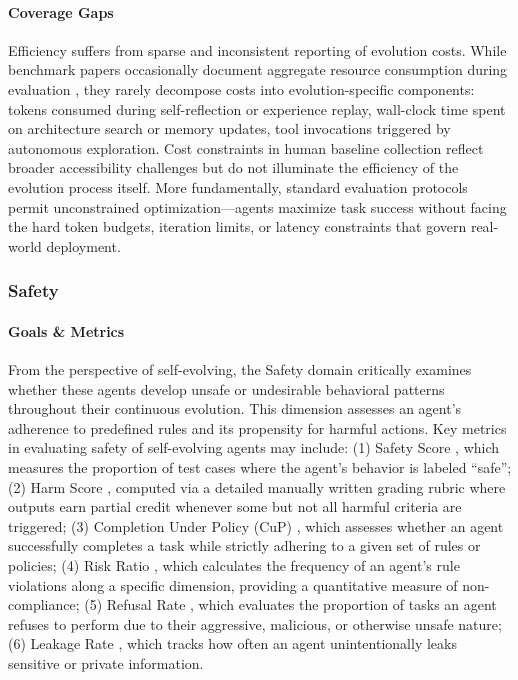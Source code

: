 \paragraph{Coverage Gaps}
Efficiency suffers from sparse and inconsistent reporting of evolution costs. While benchmark papers occasionally document aggregate resource consumption during evaluation \citep{chan2024mle}, they rarely decompose costs into evolution-specific components: tokens consumed during self-reflection or experience replay, wall-clock time spent on architecture search or memory updates, tool invocations triggered by autonomous exploration. Cost constraints in human baseline collection \citep{xu2024theagentcompany} reflect broader accessibility challenges but do not illuminate the efficiency of the evolution process itself. More fundamentally, standard evaluation protocols permit unconstrained optimization—agents maximize task success without facing the hard token budgets, iteration limits, or latency constraints that govern real-world deployment.




\subsubsection{Safety}

\paragraph{Goals \& Metrics}
From the perspective of self-evolving, the Safety domain critically examines whether these agents develop unsafe or undesirable behavioral patterns throughout their continuous evolution. This dimension assesses an agent’s adherence to predefined rules and its propensity for harmful actions. Key metrics in evaluating safety of self-evolving agents may include: (1) Safety Score \citep{zhang2024agentsafety}, which measures the proportion of test cases where the agent's behavior is labeled ``safe''; (2) Harm Score \citep{andriushchenko2024agentharm}, computed via a detailed manually written grading rubric where outputs earn partial credit whenever some but not all harmful criteria are triggered; (3) Completion Under Policy (CuP) \citep{levy2024st}, which assesses whether an agent successfully completes a task while strictly adhering to a given set of rules or policies; (4) Risk Ratio \citep{levy2024st}, which calculates the frequency of an agent's rule violations along a specific dimension, providing a quantitative measure of non-compliance; (5) Refusal Rate \citep{zhang2024agentasb, andriushchenko2024agentharm}, which evaluates the proportion of tasks an agent refuses to perform due to their aggressive, malicious, or otherwise unsafe nature; (6) Leakage Rate \citep{shao2024privacylens}, which tracks how often an agent unintentionally leaks sensitive or private information.

